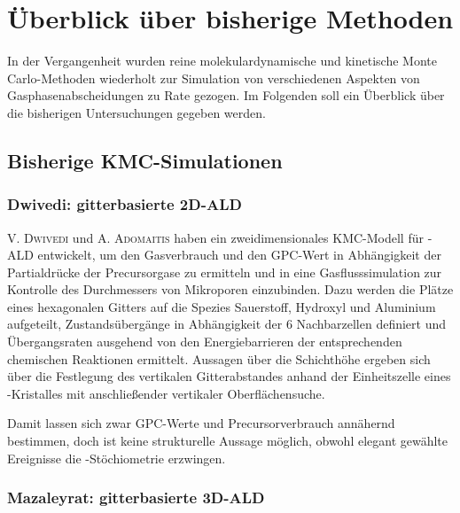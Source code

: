 \section{Überblick über bisherige Methoden}

In der Vergangenheit wurden reine molekulardynamische und kinetische Monte Carlo-Methoden wiederholt zur Simulation von verschiedenen Aspekten von Gasphasenabscheidungen zu Rate gezogen.
Im Folgenden soll ein Überblick über die bisherigen Untersuchungen gegeben werden.

\subsection{Bisherige KMC-Simulationen}

\subsubsection{Dwivedi: gitterbasierte 2D-ALD}

\textsc{V. Dwivedi} und \textsc{A. Adomaitis} haben ein zweidimensionales KMC-Modell für -ALD entwickelt\cite{dwivedi_multiscale_2009,dwivedi_multiscale_2009-1,dwivedi_multiscale_2010}, um den Gasverbrauch und den GPC-Wert in Abhängigkeit der Partialdrücke der Precursorgase zu ermitteln und in eine Gasflusssimulation zur Kontrolle des Durchmessers von Mikroporen einzubinden.
Dazu werden die Plätze eines hexagonalen Gitters auf die Spezies Sauerstoff, Hydroxyl und Aluminium aufgeteilt, Zustandsübergänge in Abhängigkeit der 6 Nachbarzellen definiert und Übergangsraten ausgehend von den Energiebarrieren der entsprechenden chemischen Reaktionen ermittelt.
Aussagen über die Schichthöhe ergeben sich über die Festlegung des vertikalen Gitterabstandes anhand der Einheitszelle eines -Kristalles mit anschließender vertikaler Oberflächensuche.

Damit lassen sich zwar GPC-Werte und Precursorverbrauch annähernd bestimmen, doch ist keine strukturelle Aussage möglich, obwohl elegant gewählte Ereignisse die -Stöchiometrie erzwingen.

\subsubsection{Mazaleyrat: gitterbasierte 3D-ALD}

